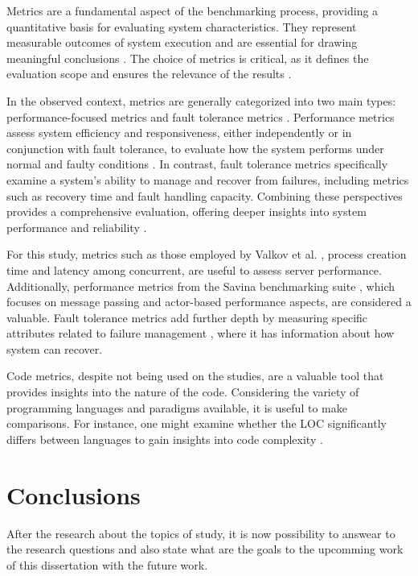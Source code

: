 Metrics are a fundamental aspect of the benchmarking process, providing a quantitative basis for evaluating system characteristics. They represent measurable outcomes of system execution and are essential for drawing meaningful conclusions \cite{Almeida2013}. The choice of metrics is critical, as it defines the evaluation scope and ensures the relevance of the results \cite{Almeida2013,Kleppmann2017}.

In the observed context, metrics are generally categorized into two main types: performance-focused metrics and fault tolerance metrics \cite{Valkov2018,Randtoul2022,Almeida2013}. Performance metrics assess system efficiency and responsiveness, either independently or in conjunction with fault tolerance, to evaluate how the system performs under normal and faulty conditions \cite{Valkov2018}. In contrast, fault tolerance metrics specifically examine a system's ability to manage and recover from failures, including metrics such as recovery time and fault handling capacity. Combining these perspectives provides a comprehensive evaluation, offering deeper insights into system performance and reliability \cite{Randtoul2022}.

For this study, metrics such as those employed by Valkov et al. \cite{Valkov2018}, process creation time and latency among concurrent, are useful to assess server performance. Additionally, performance metrics from the Savina benchmarking suite \cite{Imam2014}, which focuses on message passing and actor-based performance aspects, are considered a valuable. Fault tolerance metrics add further depth by measuring specific attributes related to failure management \cite{Randtoul2022}, where it has information about how system can recover.

Code metrics, despite not being used on the studies, are a valuable tool that provides insights into the nature of the code. Considering the variety of programming languages and paradigms available, it is useful to make comparisons. For instance, one might examine whether the \gls{LOC} significantly differs between languages to gain insights into code complexity \cite{Tanenbaum2023}.

\section{Conclusions}

After the research about the topics of study, it is now possibility to answear to the research questions and also state what are the goals to the upcomming work of this dissertation with the future work.

